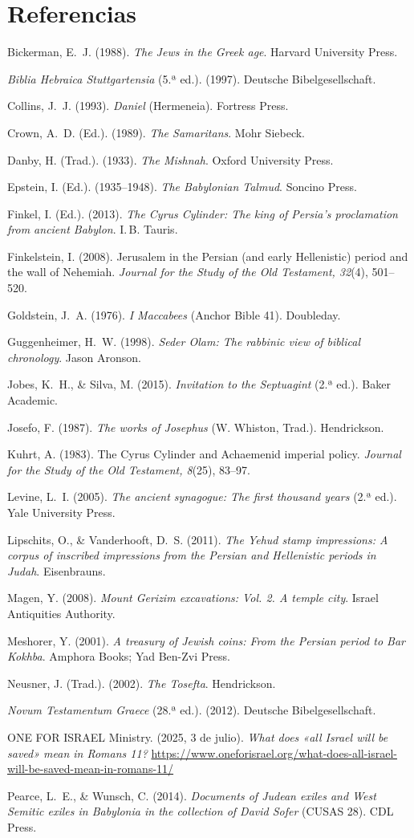 \documentclass[11pt,letterpaper]{article}
\newcommand{\refapa}[1]{\par{\RaggedRight\hangindent=1.27cm\hangafter=1\noindent #1\par}\vspace{4pt}}
\begin{document}
\section*{Referencias}
\refapa{Bickerman, E.~J. (1988). \emph{The Jews in the Greek age}. Harvard University Press.}
\refapa{\emph{Biblia Hebraica Stuttgartensia} (5.ª ed.). (1997). Deutsche Bibelgesellschaft.}
\refapa{Collins, J.~J. (1993). \emph{Daniel} (Hermeneia). Fortress Press.}
\refapa{Crown, A.~D. (Ed.). (1989). \emph{The Samaritans}. Mohr Siebeck.}
\refapa{Danby, H. (Trad.). (1933). \emph{The Mishnah}. Oxford University Press.}
\refapa{Epstein, I. (Ed.). (1935--1948). \emph{The Babylonian Talmud}. Soncino Press.}
\refapa{Finkel, I. (Ed.). (2013). \emph{The Cyrus Cylinder: The king of Persia's proclamation from ancient Babylon}. I.\,B. Tauris.}
\refapa{Finkelstein, I. (2008). Jerusalem in the Persian (and early Hellenistic) period and the wall of Nehemiah. \emph{Journal for the Study of the Old Testament, 32}(4), 501--520.}
\refapa{Goldstein, J.~A. (1976). \emph{I Maccabees} (Anchor Bible 41). Doubleday.}
\refapa{Guggenheimer, H.~W. (1998). \emph{Seder Olam: The rabbinic view of biblical chronology}. Jason Aronson.}
\refapa{Jobes, K.~H., \& Silva, M. (2015). \emph{Invitation to the Septuagint} (2.ª ed.). Baker Academic.}
\refapa{Josefo, F. (1987). \emph{The works of Josephus} (W. Whiston, Trad.). Hendrickson.}
\refapa{Kuhrt, A. (1983). The Cyrus Cylinder and Achaemenid imperial policy. \emph{Journal for the Study of the Old Testament, 8}(25), 83--97.}
\refapa{Levine, L.~I. (2005). \emph{The ancient synagogue: The first thousand years} (2.ª ed.). Yale University Press.}
\refapa{Lipschits, O., \& Vanderhooft, D.~S. (2011). \emph{The Yehud stamp impressions: A corpus of inscribed impressions from the Persian and Hellenistic periods in Judah}. Eisenbrauns.}
\refapa{Magen, Y. (2008). \emph{Mount Gerizim excavations: Vol. 2. A temple city}. Israel Antiquities Authority.}
\refapa{Meshorer, Y. (2001). \emph{A treasury of Jewish coins: From the Persian period to Bar Kokhba}. Amphora Books; Yad Ben-Zvi Press.}
\refapa{Neusner, J. (Trad.). (2002). \emph{The Tosefta}. Hendrickson.}
\refapa{\emph{Novum Testamentum Graece} (28.ª ed.). (2012). Deutsche Bibelgesellschaft.}
\refapa{ONE FOR ISRAEL Ministry. (2025, 3 de julio). \emph{What does «all Israel will be saved» mean in Romans 11?} \url{https://www.oneforisrael.org/what-does-all-israel-will-be-saved-mean-in-romans-11/}}
\refapa{Pearce, L.~E., \& Wunsch, C. (2014). \emph{Documents of Judean exiles and West Semitic exiles in Babylonia in the collection of David Sofer} (CUSAS 28). CDL Press.}
\end{document}
